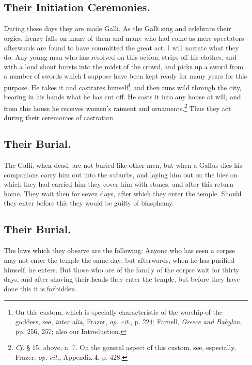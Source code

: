 \documentclass[a4paper, 11pt, oneside, polutonikogreek, english]{article}
\begin{document}
\subsection{Their Initiation Ceremonies.}
\paragraph{}
During these days they are made Galli. As the Galli sing and celebrate their orgies, frenzy falls on many of them and many who had come as mere spectators afterwards are found to have committed the great act. I will narrate what they do. Any young man who has resolved on this action, strips off his clothes, and with a loud shout bursts into the midst of the crowd, and picks up a sword from a number of swords which I suppose have been kept ready for many years for this purpose. He takes it and castrates himself\footnote{On this custom, which is specially characteristic of the worship of the goddess, see, \emph{inter alia}, Frazer, \emph{op. cit.}, p. 224; Farnell, \emph{Greece and Babylon}, pp. 256, 257; also our Introduction.} and then runs wild through the city, bearing in his hands what he has cut off. He casts it into any house at will, and from this house he receives women's raiment and ornaments.\footnote{\emph{Cf.} § 15, above, n. 7. On the general aspect of this custom, see, especially, Frazer, \emph{op. cit.}, Appendix 4. p. 428.} Thus they act during their ceremonies of castration.

\subsection{Their Burial.}
\paragraph{}
The Galli, when dead, are not buried like other men, but when a Gallus dies his companions carry him out into the suburbs, and laying him out on the bier on which they had carried him they cover him with stones, and after this return home. They wait then for seven days, after which they enter the temple. Should they enter before this they would be guilty of blasphemy.

\subsection{Their Burial.}
\paragraph{}
The laws which they observe are the following: Anyone who has seen a corpse may not enter the temple the same day; but afterwards, when he has purified himself, he enters. But those who are of the family of the corpse wait for thirty days, and after shaving their heads they enter the temple, but before they have done this it is forbidden.
\end{document}
